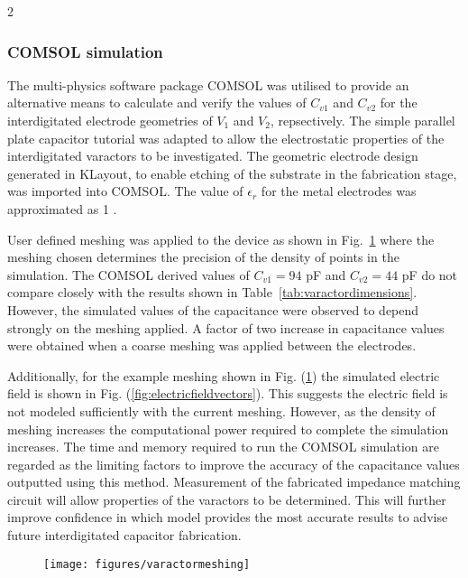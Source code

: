 \documentclass[10pt,a4paper,twoside]{article}
\begin{document}
\begin{multicols}{2}
\subsubsection{\label{subsubsec:COMSOLsimulation}COMSOL simulation}
The multi-physics software package COMSOL was utilised to provide an alternative means to calculate and verify the values of $C_{v1}$ and $C_{v2}$ for the interdigitated electrode geometries of $V_{1}$ and $V_{2}$, repsectively. The simple parallel plate capacitor tutorial \cite{COMSOLtut} was adapted to allow the electrostatic properties of the interdigitated varactors to be investigated. The geometric electrode design generated in KLayout, to enable etching of the substrate in the fabrication stage, was imported into COMSOL. The value of $\epsilon_{r}$ for the metal electrodes was approximated as 1 \cite{PhysRevB.6.4370}. 
\par
User defined meshing was applied to the device as shown in Fig.~\ref{fig:varactormeshing} where the meshing chosen determines the precision of the density of points in the simulation. The COMSOL derived values of $C_{v1}= 94$ pF and $C_{v2}= 44$ pF do not compare closely with the results shown in Table~\ref{tab:varactordimensions}. However, the simulated values of the capacitance were observed to depend strongly on the meshing applied. A factor of two increase in capacitance values were obtained when a coarse meshing was applied between the electrodes. 
\par
Additionally, for the example meshing shown in Fig. (\ref{fig:varactormeshing}) the simulated electric field is shown in Fig. (\ref{fig:electricfieldvectors}). This suggests the electric field is not modeled sufficiently with the current meshing. However, as the density of meshing increases the computational power required to complete the simulation increases. The time and memory required to run the COMSOL simulation are regarded as the limiting factors to improve the accuracy of the capacitance values outputted using this method. Measurement of the fabricated impedance matching circuit will allow properties of the varactors to be determined. This will further improve confidence in which model provides the most accurate results to advise future interdigitated capacitor fabrication.  
\par 
\begin{figure*}[b]
\centering
\begin{subfigure}[b]{0.45\textwidth}
   \texttt{[image: figures/varactormeshing]}
	\caption{\label{fig:varactormeshing}}

\end{subfigure}
\end{figure*}
\end{multicols}
\end{document}
